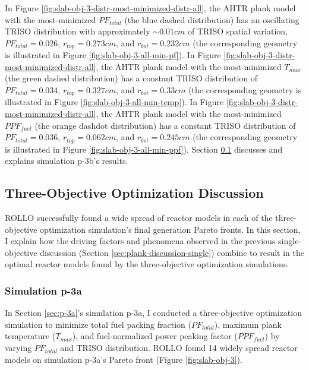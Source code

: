 In Figure \ref{fig:slab-obj-3-distr-most-minimized-distr-all}, the \gls{AHTR} plank model 
with the most-minimized $PF_{total}$ (the blue dashed distribution) has an 
oscillating TRISO distribution with approximately ${\sim}0.01cm$ of TRISO spatial variation, 
$PF_{total} = 0.026$, $r_{top}=0.273cm$, and $r_{bot}=0.232cm$ (the corresponding geometry 
is illustrated in Figure \ref{fig:slab-obj-3-all-min-pf}).
In Figure \ref{fig:slab-obj-3-distr-most-minimized-distr-all}, the \gls{AHTR} plank 
model with the most-minimized $T_{max}$ (the green dashed distribution) has a constant 
TRISO distribution of $PF_{total}=0.034$, $r_{top}=0.327cm$, and $r_{bot}=0.33cm$
(the corresponding geometry is illustrated in Figure \ref{fig:slab-obj-3-all-min-temp}).
In Figure \ref{fig:slab-obj-3-distr-most-minimized-distr-all}, the \gls{AHTR} plank 
model with the most-minimized $PPF_{fuel}$ (the orange dashdot distribution) has a 
constant TRISO distribution of $PF_{total} = 0.036$, $r_{top}=0.062cm$, and 
$r_{bot}=0.245cm$ (the corresponding geometry is illustrated in Figure 
\ref{fig:slab-obj-3-all-min-ppf}).
Section \ref{sec:plank-discussion-three} discusses and explains simulation p-3b's 
results.

\subsection{Three-Objective Optimization Discussion}
\label{sec:plank-discussion-three} 
\gls{ROLLO} successfully found a wide spread of reactor models in each of the 
three-objective optimization simulation's final generation Pareto fronts.
In this section, I explain how the driving factors and phenomena observed in 
the previous single-objective discussion (Section \ref{sec:plank-discussion-single}) 
combine to result in the optimal reactor models found by the three-objective 
optimization simulations. 

\subsubsection{Simulation p-3a}
In Section \ref{sec:p-3a}'s simulation p-3a, I conducted a three-objective 
optimization simulation to minimize total fuel packing fraction ($PF_{total}$), 
maximum plank temperature ($T_{max}$), and fuel-normalized power peaking factor 
($PPF_{fuel}$) by varying $PF_{total}$ and TRISO distribution.
\gls{ROLLO} found 14 widely spread reactor models on simulation p-3a's Pareto 
front (Figure \ref{fig:slab-obj-3}). 

